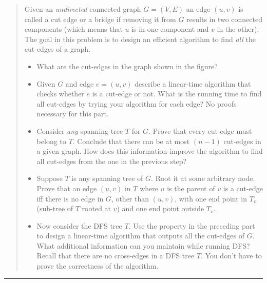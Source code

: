 \documentclass[11pt]{article}
\begin{document}
\begin{quote}
 Given an \emph{undirected} connected graph $G=(V,E)$ an edge $(u,v)$ is
  called a cut edge or a bridge if removing it from $G$ results in
  two connected components (which means that $u$ is in one component
  and $v$ in the other). The goal in this problem is to design an efficient
  algorithm to find {\em all} the cut-edges of a graph.

  \begin{itemize}
  \item What are the cut-edges in the graph shown in the figure?

  \item Given $G$ and edge $e=(u,v)$ describe a linear-time algorithm
    that checks whether $e$ is a cut-edge or not. What is the running time
    to find all cut-edges by trying your algorithm for each edge? No proofs
    necessary for this part.
  \item Consider {\em any} spanning tree $T$ for $G$. Prove that every
    cut-edge must belong to $T$. Conclude that there can be at most $(n-1)$
    cut-edges in a given graph. How does this information improve the
    algorithm to find all cut-edges from the one in the previous step?
  \item Suppose $T$ is any spanning tree of $G$. Root it at some
    arbitrary node.  Prove that an edge $(u,v)$ in $T$ where $u$ is
    the parent of $v$ is a cut-edge iff there is no edge in $G$, other
    than $(u,v)$, with one end point in $T_v$ (sub-tree of $T$ rooted
    at $v$) and one end point outside $T_v$.
  \item Now consider the DFS tree $T$.  Use the property in the
    preceding part to design a linear-time algorithm that outputs all
    the cut-edges of $G$. What additional information can you maintain
    while running DFS? Recall that there are no cross-edges in a DFS
    tree $T$. You don't have to prove the correctness of
    the algorithm.
  \end{itemize}
\end{quote}
\hrule
\end{document}
